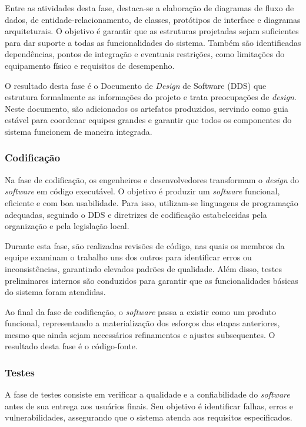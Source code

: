 Entre as atividades desta fase, destaca-se a elaboração de diagramas de fluxo de dados, de entidade-relacionamento, de classes, protótipos de interface e diagramas arquiteturais. O objetivo é garantir que as estruturas projetadas sejam suficientes para dar suporte a todas as funcionalidades do sistema. Também são identificadas dependências, pontos de integração e eventuais restrições, como limitações do equipamento físico e requisitos de desempenho.

O resultado desta fase é o Documento de \textit{Design} de Software (DDS) que estrutura formalmente as informações do projeto e trata preocupações de \textit{design}. Neste documento, são adicionados os artefatos produzidos, servindo como guia estável para coordenar equipes grandes e garantir que todos os componentes do sistema funcionem de maneira integrada.

\subsubsection{Codificação}

Na fase de codificação, os engenheiros e desenvolvedores transformam o \textit{design} do \textit{software} em código executável. O objetivo é produzir um \textit{software} funcional, eficiente e com boa usabilidade. Para isso, utilizam-se linguagens de programação adequadas, seguindo o DDS e diretrizes de codificação estabelecidas pela organização e pela legislação local.

Durante esta fase, são realizadas revisões de código, nas quais os membros da equipe examinam o trabalho uns dos outros para identificar erros ou inconsistências, garantindo elevados padrões de qualidade. Além disso, testes preliminares internos são conduzidos para garantir que as funcionalidades básicas do sistema foram atendidas.

Ao final da fase de codificação, o \textit{software} passa a existir como um produto funcional, representando a materialização dos esforços das etapas anteriores, mesmo que ainda sejam necessários refinamentos e ajustes subsequentes. O resultado desta fase é o código-fonte.

\subsubsection{Testes}

A fase de testes consiste em verificar a qualidade e a confiabilidade do \textit{software} antes de sua entrega aos usuários finais. Seu objetivo é identificar falhas, erros e vulnerabilidades, assegurando que o sistema atenda aos requisitos especificados.

